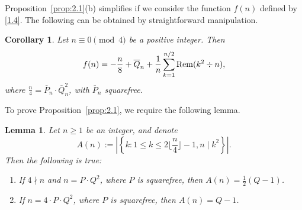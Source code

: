 \documentclass{amsart}
\theoremstyle{plain}
\newtheorem{corollary}[theorem]{Corollary}
\newtheorem{lemma}[theorem]{Lemma}
\numberwithin{equation}{section}
\begin{document}
Proposition~\ref{prop:2.1}(b) simplifies if we consider the function $f(n)$ 
defined by \eqref{1.4}. The following can be obtained by straightforward
manipulation.

\begin{corollary}\label{cor:2.2}
Let $n\equiv 0\pmod{4}$ be a positive integer. Then
\begin{equation}\label{2.3a}
f(n)=-\frac{n}{8}+\overline{Q}_n
+\frac{1}{n}\sum_{k=1}^{n/2}{\rm Rem}(k^2\div n),
\end{equation}
where $\frac{n}{4}=\overline{P}_n\cdot\overline{Q}_n^2$, with $\overline{P}_n$ 
squarefree.
\end{corollary}

To prove Proposition~\ref{prop:2.1}, we require the following lemma.

\begin{lemma}\label{lem:2.2}
Let $n\geq 1$ be an integer, and denote
\begin{equation}\label{2.4}
A(n):=\left|\left\{k: 1\leq k\leq \textstyle{2\lfloor\frac{n}{4}\rfloor-1}, 
n\mid k^2
\right\}\right|.
\end{equation}
Then the following is true:
\begin{enumerate}
\item[(a)] If $4\nmid n$ and $n=P\cdot Q^2$, where $P$ is squarefree, then
$A(n)=\frac{1}{2}(Q-1)$.
\item[(b)] If $n=4\cdot P\cdot Q^2$, where $P$ is squarefree, then $A(n)=Q-1$.
\end{enumerate}
\end{lemma}
\end{document}
